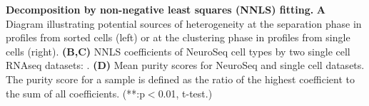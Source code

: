 \textbf{Decomposition by non-negative least squares (NNLS) fitting.}
\textbf{A} Diagram illustrating potential sources of heterogeneity at the separation phase in profiles from sorted cells (left) or at the clustering phase in profiles from single cells (right).
\textbf{(B,C)} NNLS coefficients of NeuroSeq cell types by two single cell RNAseq datasets: \citep{Tasic_2018,Zeisel_2018}.
\textbf{(D)} Mean purity scores for NeuroSeq and single cell datasets. The purity score for a sample is defined as the ratio of the highest coefficient to the sum of all coefficients. (**:p$<$0.01, t-test.)